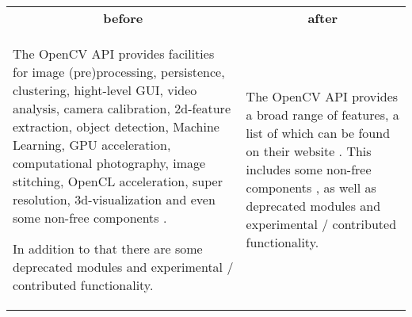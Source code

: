 \documentclass[12pt, a4paper]{article}
\begin{document}
\begin{itemize}
	\begin{tabular}{p{.5\linewidth} p{.5\linewidth}}
		\multicolumn{1}{c}{\textbf{before}} & \multicolumn{1}{c}{\textbf{after}}\\
		The OpenCV API provides facilities for image (pre)processing, persistence, clustering, hight-level GUI, video analysis, camera calibration, 2d-feature extraction, object detection, Machine Learning, GPU acceleration, computational photography, image stitching, OpenCL acceleration, super resolution, 3d-visualization and even some non-free components \cite{openCVNonFree}.

		In addition to that there are some deprecated modules and experimental / contributed functionality. \cite{openCVRefMan}&
		The OpenCV API provides a broad range of features, a list of which can be found on their website \cite{openCVRefMan}. This includes some non-free components \cite{openCVNonFree}, as well as deprecated modules and experimental / contributed functionality.\\
	\end{tabular}
\end{itemize}
\end{document}
